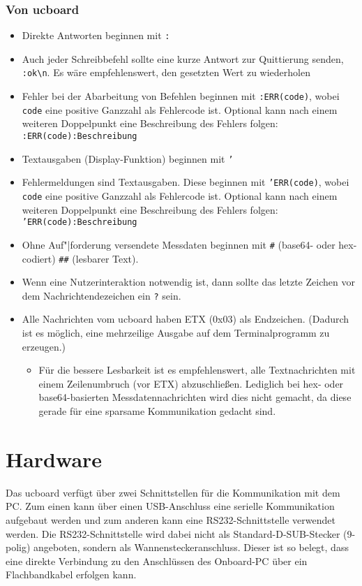\subsubsection{Von ucboard}
\begin{itemize}
	\item Direkte Antworten beginnen mit \texttt{:}
	\item Auch jeder Schreibbefehl sollte eine kurze Antwort zur Quittierung senden, \zB \verb+:ok\n+. Es wäre empfehlenswert, den gesetzten Wert zu wiederholen
	\item Fehler bei der Abarbeitung von Befehlen beginnen mit \texttt{:ERR(code)}, wobei \texttt{code} eine positive Ganzzahl als Fehlercode ist. Optional kann nach einem weiteren Doppelpunkt eine Beschreibung des Fehlers folgen: \texttt{:ERR(code):Beschreibung} 
	\item Textausgaben (Display-Funktion) beginnen mit \texttt{'}
	\item Fehlermeldungen sind Textausgaben. Diese beginnen mit \texttt{'ERR(code)}, wobei \texttt{code} eine positive Ganzzahl als Fehlercode ist. Optional kann nach einem weiteren Doppelpunkt eine Beschreibung des Fehlers folgen: \texttt{'ERR(code):Beschreibung} 
	\item Ohne Auf"|forderung versendete Messdaten beginnen mit \texttt{\#} (base64- oder hex-codiert) \bzw \texttt{\#\#} (lesbarer Text).
	\item Wenn eine Nutzerinteraktion notwendig ist, dann sollte das letzte Zeichen vor dem Nachrichtendezeichen ein \texttt{?} sein.
	\item Alle Nachrichten vom ucboard haben ETX (0x03) als Endzeichen. (Dadurch ist es möglich, eine mehrzeilige Ausgabe auf dem Terminalprogramm zu erzeugen.)
		\begin{itemize}
			\item Für die bessere Lesbarkeit ist es empfehlenswert, alle Textnachrichten mit einem Zeilenumbruch (vor ETX) abzuschließen. Lediglich bei hex- oder base64-basierten Messdatennachrichten wird dies nicht gemacht, da diese gerade für eine sparsame Kommunikation gedacht sind.
		\end{itemize}
\end{itemize}



\section{Hardware}

Das ucboard verfügt über zwei Schnittstellen für die Kommunikation mit dem PC. Zum einen kann über einen USB-Anschluss eine serielle Kommunikation aufgebaut werden und zum anderen kann eine RS232-Schnittstelle verwendet werden. Die RS232-Schnittstelle wird dabei nicht als Standard-D-SUB-Stecker (9-polig) angeboten, sondern als Wannensteckeranschluss. Dieser ist so belegt, dass eine direkte Verbindung zu den Anschlüssen des Onboard-PC über ein Flachbandkabel erfolgen kann.

